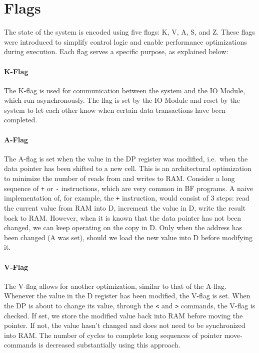 \section{Flags} \label{sec:architecture:flags}
The state of the system is encoded using five flags: K, V, A, S, and Z. These flags were introduced to simplify control logic and enable performance optimizations during execution. Each flag serves a specific purpose, as explained below:

\paragraph{K-Flag} The K-flag is used for communication between the system and the IO Module, which run asynchronously. The flag is set by the IO Module and reset by the system to let each other know when certain data transactions have been completed.

\paragraph{A-Flag} The A-flag is set when the value in the DP register was modified, i.e.~when the data pointer has been shifted to a new cell. This is an architectural optimization to minimize the number of reads from and writes to RAM. Consider a long sequence of \texttt{+} or \texttt{-} instructions, which are very common in BF programs. A naive implementation of, for example, the \texttt{+} instruction, would consist of 3 steps: read the current value from RAM into D, increment the value in D, write the result back to RAM. However, when it is known that the data pointer has not been changed, we can keep operating on the copy in D. Only when the address has been changed (A was set), should we load the new value into D before modifying it.

\paragraph{V-Flag} The V-flag allows for another optimization, similar to that of the A-flag. Whenever the value in the D register has been modified, the V-flag is set. When the DP is about to change its value, through the \texttt{<} and \texttt{>} commands, the V-flag is checked. If set, we store the modified value back into RAM before moving the pointer. If not, the value hasn't changed and does not need to be synchronized into RAM. The number of cycles to complete long sequences of pointer move-commands is decreased substantially using this approach.

